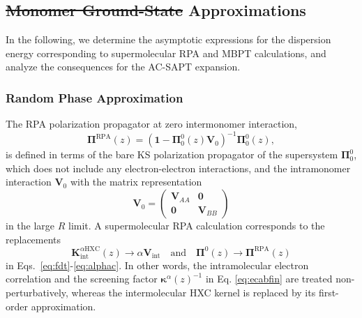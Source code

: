 \documentclass[journal=jctcce,manuscript=article]{achemso}
\providecommand{\DIFadd}[1]{{\protect\color{blue}\uwave{#1}}} %
\providecommand{\DIFdel}[1]{{\protect\color{red}\sout{#1}}}                      %
\providecommand{\DIFaddbegin}{} %
\providecommand{\DIFaddend}{} %
\providecommand{\DIFdelbegin}{} %
\providecommand{\DIFdelend}{} %
\newcommand{\DIFscaledelfig}{0.5}
\newlength{\DIFdelgraphicswidth} %
\newlength{\DIFdelgraphicsheight} %
\newcommand{\DIFaddincludegraphics}[2][]{{\color{blue}\fbox{\DIFOincludegraphics[#1]{#2}}}} %
\newcommand{\DIFdelincludegraphics}[2][]{%
\sbox{\DIFdelgraphicsbox}{\DIFOincludegraphics[#1]{#2}}%
\settoboxwidth{\DIFdelgraphicswidth}{\DIFdelgraphicsbox} %
\settoboxtotalheight{\DIFdelgraphicsheight}{\DIFdelgraphicsbox} %
\scalebox{\DIFscaledelfig}{%
\parbox[b]{\DIFdelgraphicswidth}{\usebox{\DIFdelgraphicsbox}\\[-\baselineskip] \rule{\DIFdelgraphicswidth}{0em}}\llap{\resizebox{\DIFdelgraphicswidth}{\DIFdelgraphicsheight}{%
\setlength{\unitlength}{\DIFdelgraphicswidth}%
\begin{picture}(1,1)%
\thicklines\linethickness{2pt} %
{\color[rgb]{1,0,0}\put(0,0){\framebox(1,1){}}}%
{\color[rgb]{1,0,0}\put(0,0){\line( 1,1){1}}}%
{\color[rgb]{1,0,0}\put(0,1){\line(1,-1){1}}}%
\end{picture}%
}\hspace*{3pt}}} %
} %
\DeclareRobustCommand{\DIFaddbegin}{\DIFOaddbegin \let\includegraphics\DIFaddincludegraphics} %
\DeclareRobustCommand{\DIFaddend}{\DIFOaddend \let\includegraphics\DIFOincludegraphics} %
\DeclareRobustCommand{\DIFdelbegin}{\DIFOdelbegin \let\includegraphics\DIFdelincludegraphics} %
\DeclareRobustCommand{\DIFdelend}{\DIFOaddend \let\includegraphics\DIFOincludegraphics} %
\begin{document}
\subsection{\DIFdelbegin \DIFdel{Monomer Ground-State }\DIFdelend Approximations \DIFaddbegin \DIFadd{within AC-SAPT}\DIFaddend }

In the following, we determine the asymptotic expressions for the
dispersion energy corresponding to supermolecular RPA and MBPT
calculations, and analyze the consequences for the AC-SAPT expansion.

\subsubsection{Random Phase Approximation}
\label{sec:rpa}

The RPA polarization propagator
at zero intermonomer interaction,
\begin{equation}
  \label{eq:pirpa}
  \boldsymbol{\Pi}^\text{RPA}(z) = \left( \mathbf{1}-
    \boldsymbol{\Pi}^0_0(z) \mathbf{V}_0 \right)^{-1}
  \boldsymbol{\Pi}^0_0(z),
\end{equation}
is defined in terms of the bare KS 
polarization propagator of the supersystem $\boldsymbol{\Pi}^0_0$,
which does not include any electron-electron interactions, and the 
intramonomer interaction $\mathbf{V}_0$ with the matrix
representation
\begin{equation}
  \mathbf{V}_0 = \begin{pmatrix}
    \mathbf{V}_{AA} & \mathbf{0}\\
     \mathbf{0} & \mathbf{V}_{BB} \end{pmatrix}
\end{equation}
in the large $R$ limit. A supermolecular RPA calculation corresponds to the
replacements
\begin{equation}
  \label{eq:rparep}
\mathbf{K}^{\alpha\text{HXC}}_\text{int}(z)
\rightarrow \alpha \mathbf{V}_{\text{int}}\quad \text{and} \quad
\boldsymbol{\Pi}^0(z) 
\rightarrow \boldsymbol{\Pi}^\text{RPA}(z)
\end{equation}
in Eqs.~\eqref{eq:fdt}-\eqref{eq:alphac}. In other words, the
intramolecular electron correlation and the screening factor
$\boldsymbol{\kappa}^\alpha(z)^{-1}$ in Eq. \eqref{eq:ecabfin} are
treated non-perturbatively, whereas the intermolecular HXC kernel is
replaced by its first-order approximation.
\end{document}
